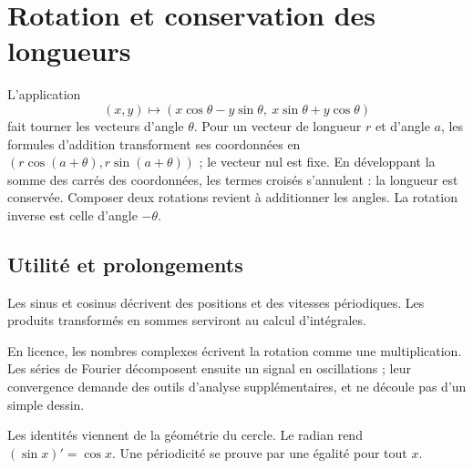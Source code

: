 \documentclass[../cours_1re.tex]{subfiles}
\begin{document}
\section{Rotation et conservation des longueurs}
L'application
\[
(x,y)\longmapsto(x\cos\theta-y\sin\theta,\ x\sin\theta+y\cos\theta)
\]
fait tourner les vecteurs d'angle $\theta$. Pour un vecteur de longueur $r$
et d'angle $a$, les formules d'addition transforment ses coordonnées en
$(r\cos(a+\theta),r\sin(a+\theta))$ ; le vecteur nul est fixe.
En développant la somme des carrés des coordonnées, les termes croisés
s'annulent : la longueur est conservée. Composer deux rotations revient
à additionner les angles. La rotation inverse est celle d'angle $-\theta$.

\begin{finchapitre}
\section{Utilité et prolongements}
Les sinus et cosinus décrivent des positions et des vitesses périodiques.
Les produits transformés en sommes serviront au calcul d'intégrales.

En licence, les nombres complexes écrivent la rotation comme une multiplication.
Les séries de Fourier décomposent ensuite un signal en oscillations ; leur convergence
demande des outils d'analyse supplémentaires, et ne découle pas d'un simple dessin.
\begin{retenir}
Les identités viennent de la géométrie du cercle. Le radian rend
$(\sin x)'=\cos x$. Une périodicité se prouve par une égalité pour tout $x$.
\end{retenir}
\end{finchapitre}
\end{document}
